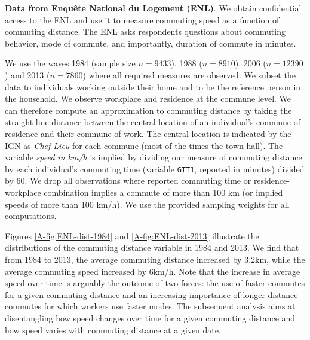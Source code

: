 \documentclass[11pt]{report}
\newcommand{\ENL}{../../output/CASD/2021-03-31/ENL}
\begin{document}
\noindent \textbf{Data from Enquête National du Logement (ENL)}. We obtain confidential access to the ENL and use it to measure commuting speed as a function of commuting distance. The ENL asks respondents questions about commuting behavior, mode of commute, and importantly, duration of commute in minutes.

We use the waves 1984 (sample size $n=9433$), 1988 ($n=8910$), 2006 ($n=12390$) and 2013 ($n=7860$) where all required measures are observed. We subset the data to individuals working outside their home and to be the reference person in the household. We observe workplace and residence at the commune level. We can therefore compute an approximation to commuting distance by taking the straight line distance between the central location of an
individual's commune of residence and their commune of work. The central location is indicated by the IGN as \emph{Chef Lieu}
for each commune (most of the times the town hall). The variable \emph{speed in km/h} is implied by dividing our measure of commuting distance by each individual's commuting time (variable \texttt{GTT1}, reported in minutes) divided by 60. We drop all observations where reported commuting time or residence-workplace combination implies a commute of more than 100 km (or implied speeds of more than 100 km/h).
We use the provided sampling weights for all computations. 

Figures \ref{A-fig:ENL-dist-1984} and \ref{A-fig:ENL-dist-2013} illustrate the distributions of the commuting distance variable in 1984 and 2013. We find that from 1984 to 2013, the average commuting distance increased by 3.2km, while the average commuting speed increased by 6km/h. Note that the increase in average speed over time is arguably the outcome of two forces: the use of faster commutes for a given commuting distance and an increasing importance of longer distance commutes for which workers use faster modes. The subsequent analysis aims at disentangling how speed changes over time for a given commuting distance and how speed varies with commuting distance at a given date. 



\end{document}
